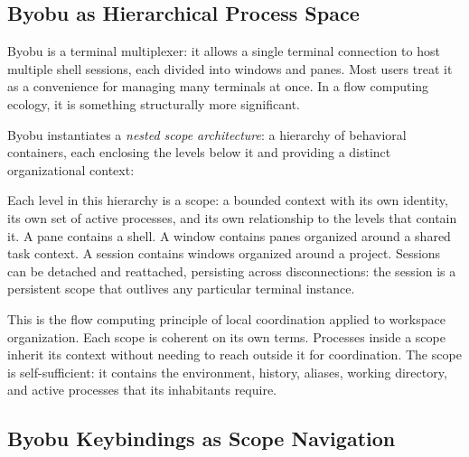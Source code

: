 \documentclass[12pt, a4paper]{article}
\begin{document}
\subsection{Byobu as Hierarchical Process Space}

Byobu is a terminal multiplexer: it allows a single terminal
connection to host multiple shell sessions, each divided into
windows and panes. Most users treat it as a convenience for
managing many terminals at once. In a flow computing ecology,
it is something structurally more significant.

Byobu instantiates a \emph{nested scope architecture}: a
hierarchy of behavioral containers, each enclosing the levels
below it and providing a distinct organizational context:

\begin{center}
\end{center}

Each level in this hierarchy is a scope: a bounded context with
its own identity, its own set of active processes, and its own
relationship to the levels that contain it. A pane contains a
shell. A window contains panes organized around a shared task
context. A session contains windows organized around a project.
Sessions can be detached and reattached, persisting across
disconnections: the session is a persistent scope that outlives
any particular terminal instance.

This is the flow computing principle of local coordination
applied to workspace organization. Each scope is coherent on
its own terms. Processes inside a scope inherit its context
without needing to reach outside it for coordination. The
scope is self-sufficient: it contains the environment, history,
aliases, working directory, and active processes that its
inhabitants require.

\subsection{Byobu Keybindings as Scope Navigation}
\end{document}
